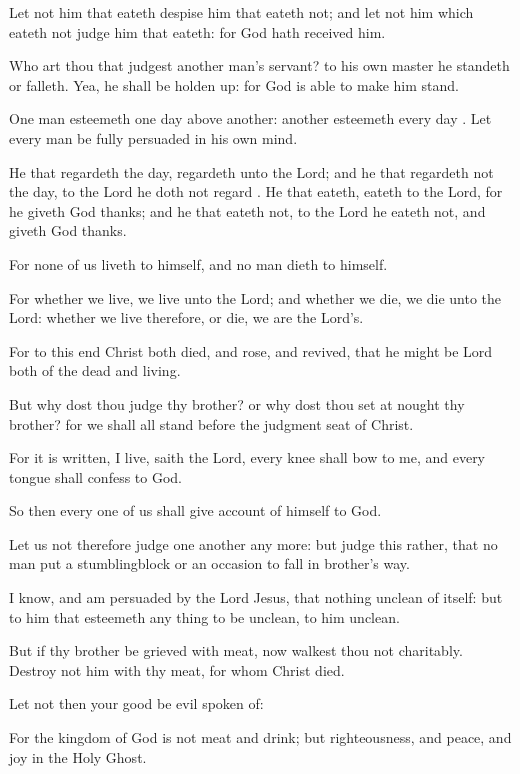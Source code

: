 {Let
not him that
eateth
despise him that
eateth
not;
and
let
not him which
eateth
not
judge him that
eateth:
for
God hath
received
him.

Who
art
thou that
judgest another
man’s
servant? to his
own
master he
standeth
or
falleth.
Yea, he shall be holden
up:
for
God
is
able to
make
him
stand.

One
man
esteemeth one
day
above
another:
another
esteemeth
every
day
{}.
Let every
man be fully
persuaded
in his
own
mind.

He that
regardeth the
day,
regardeth
{} unto the
Lord;
and he that
regardeth
not the
day, to the
Lord he
doth
not
regard
{}. He that
eateth,
eateth to the
Lord,
for he
giveth
God
thanks;
and he that
eateth
not, to the
Lord he
eateth
not,
and
giveth
God
thanks.

For
none of
us
liveth to
himself,
and no
man
dieth to
himself.

For
whether we
live, we
live unto the
Lord;
and
whether we
die, we
die unto the
Lord:
whether we
live
therefore,
or
die, we
are the
Lord’s.

For
to this
end
Christ
both
died,
and
rose,
and
revived,
that he might be
Lord
both of the
dead
and
living.

But
why
dost
thou
judge
thy
brother?
or
why
dost
thou set at
nought
thy
brother?
for we
shall
all
stand before the judgment
seat of
Christ.

For it is
written,
{}
I
live,
saith the
Lord,
every
knee shall
bow to
me,
and
every
tongue shall
confess to
God.

So
then every
one of
us shall
give
account
of
himself to
God.

Let
us
not
therefore
judge one
another any
more:
but
judge
this
rather,
that no
man
put a
stumblingblock
or an occasion to
fall
in
{}
brother’s way.

I
know,
and am
persuaded
by the
Lord
Jesus,
that
{}
nothing
unclean
of
itself:
but to him that
esteemeth any
thing to
be
unclean, to
him
{}
unclean.

But
if
thy
brother be
grieved
with
{}
meat,
now walkest
thou
not
charitably.
Destroy
not
him
with
thy
meat,
for
whom
Christ
died.

Let
not
then
your
good be evil spoken
of:

For the
kingdom of
God
is
not
meat
and
drink;
but
righteousness,
and
peace,
and
joy
in
the
Holy
Ghost.

}

